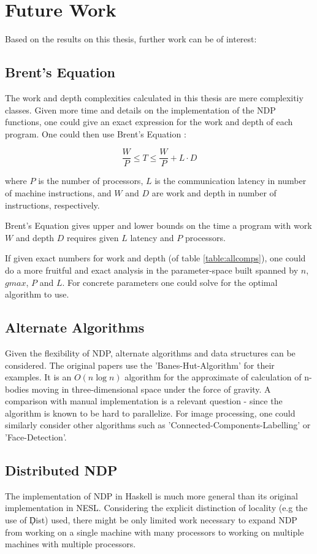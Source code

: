   
\section{Future Work}
  Based on the results on this thesis, further work can be of interest:
  
  \subsection{Brent's Equation}
    The work and depth complexities calculated in this thesis are mere complexitiy classes.
    Given more time and details on the implementation of the NDP functions,
    one could give an exact expression for the work and depth of each program.
    One could then use Brent's Equation \cite{Brent2011}:
    
    $$ \frac{W}{P} \leq T \leq \frac{W}{P} + L \cdot D $$
    
    where $P$ is the number of processors,
    $L$ is the communication latency in number of machine instructions,
    and $W$ and $D$ are work and depth in number of instructions, respectively.
    
    Brent's Equation gives upper and lower bounds on
    the time a program with work $W$ and depth $D$
    requires given $L$ latency and $P$ processors.
    
    If given exact numbers for work and depth (of table \ref{table:allcomps}), one could do a
    more fruitful and exact analysis in the parameter-space
    built spanned by $n$, $gmax$, $P$ and $L$.
    For concrete parameters one could solve for the optimal
    algorithm to use.
  
  \subsection{Alternate Algorithms}
    Given the flexibility of NDP, alternate algorithms and data structures can be considered.
    The original papers \cite{Harness2008} use the 'Banes-Hut-Algorithm' for
    their examples. It is an $O(n \log n)$ algorithm for the approximate of
    calculation of n-bodies moving in three-dimensional space under the
    force of gravity. A comparison with manual implementation is
    a relevant question - since the algorithm is known
    to be hard to parallelize. For image processing,
    one could similarly consider other algorithms such as
    'Connected-Components-Labelling' or 'Face-Detection'.
    
  \subsection{Distributed NDP}
    The implementation of NDP in Haskell is much more general than its original
    implementation in NESL. Considering the explicit distinction of locality (e.g the use of \c{Dist})
    used, there might be only limited work necessary to expand NDP from working on a single machine
    with many processors to working on multiple machines with multiple processors.

